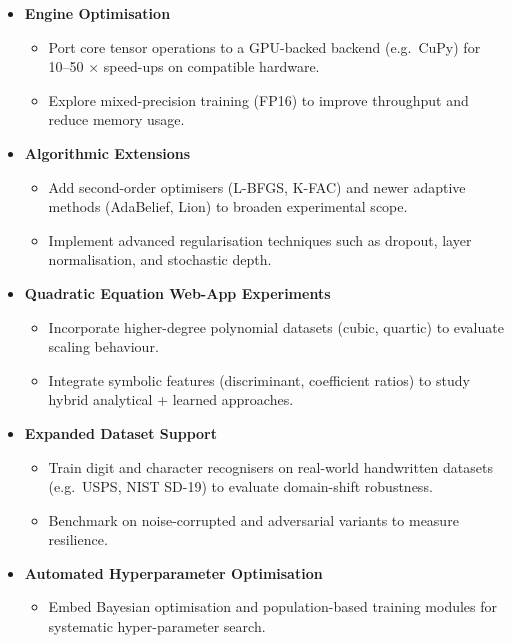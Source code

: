 \documentclass[11pt,a4paper]{report}
\begin{document}
\begin{itemize}
    \item \textbf{Engine Optimisation}
          \begin{itemize}
              \item Port core tensor operations to a GPU-backed backend (e.g.\ CuPy) for 10–50 × speed-ups on compatible hardware.
              \item Explore mixed-precision training (FP16) to improve throughput and reduce memory usage.
          \end{itemize}
    \item \textbf{Algorithmic Extensions}
          \begin{itemize}
              \item Add second-order optimisers (L-BFGS, K-FAC) and newer adaptive methods (AdaBelief, Lion) to broaden experimental scope.
              \item Implement advanced regularisation techniques such as dropout, layer normalisation, and stochastic depth.
          \end{itemize}
    \item \textbf{Quadratic Equation Web-App Experiments}
          \begin{itemize}
              \item Incorporate higher-degree polynomial datasets (cubic, quartic) to evaluate scaling behaviour.
              \item Integrate symbolic features (discriminant, coefficient ratios) to study hybrid analytical + learned approaches.
          \end{itemize}
    \item \textbf{Expanded Dataset Support}
          \begin{itemize}
              \item Train digit and character recognisers on real-world handwritten datasets (e.g.\ USPS, NIST SD-19) to evaluate domain-shift robustness.
              \item Benchmark on noise-corrupted and adversarial variants to measure resilience.
          \end{itemize}
    \item \textbf{Automated Hyperparameter Optimisation}
          \begin{itemize}
              \item Embed Bayesian optimisation and population-based training modules for systematic hyper-parameter search.
          \end{itemize}

\end{itemize}
\end{document}
